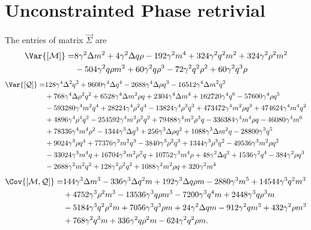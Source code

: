\section{Unconstrainted Phase retrivial}
The entries of matrix \(\vec{\Sigma}\) are 
\[\begin{split}
  \Var{[\mathcal{M}]} =& 8 \gamma ^2 \Delta  m^2+4 \gamma ^2 \Delta  q \rho-192 \gamma ^2 m^4+324 \gamma ^2 q^2 m^2+324 \gamma ^2 \rho^2 m^2 \\
                       & -504 \gamma ^2 q \rho m^2+60 \gamma ^2 q \rho^3-72 \gamma ^2 q^2 \rho^2+60 \gamma ^2 q^3 \rho 
\end{split}\]\[\begin{split}
  \Var{[\mathcal{Q}]} =& 128 \gamma ^4 \Delta ^2 q^2+9600 \gamma ^4 \Delta  q^4-2688 \gamma ^4 \Delta  \rho q^3-16512 \gamma ^4 \Delta  m^2 q^2 \\
                       &+768 \gamma ^4 \Delta  \rho^2 q^2+6528 \gamma ^4 \Delta  m^2 \rho q+2304 \gamma ^4 \Delta  m^4+162720 \gamma ^4 q^6-57600 \gamma ^4 \rho q^5 \\
                       &-593280 \gamma ^4 m^2 q^4+28224 \gamma ^4 \rho^2 q^4-13824 \gamma ^4 \rho^3 q^3+473472 \gamma ^4 m^2 \rho q^3+474624 \gamma ^4 m^4 q^2 \\
                       &+4896 \gamma ^4 \rho^4 q^2-254592 \gamma ^4 m^2 \rho^2 q^2+79488 \gamma ^4 m^2 \rho^3 q-336384 \gamma ^4 m^4 \rho q-46080 \gamma ^4 m^6 \\
                       &+78336 \gamma ^4 m^4 \rho^2-1344 \gamma ^3 \Delta  q^3+256 \gamma ^3 \Delta  \rho q^2+1088 \gamma ^3 \Delta  m^2 q-28800 \gamma ^3 q^5 \\
                       &+9024 \gamma ^3 \rho q^4+77376 \gamma ^3 m^2 q^3-3840 \gamma ^3 \rho^2 q^3+1344 \gamma ^3 \rho^3 q^2-49536 \gamma ^3 m^2 \rho q^2 \\
                       &-33024 \gamma ^3 m^4 q+16704 \gamma ^3 m^2 \rho^2 q+10752 \gamma ^3 m^4 \rho+48 \gamma ^2 \Delta  q^2+1536 \gamma ^2 q^4-384 \gamma ^2 \rho q^3 \\
                       &-2688 \gamma ^2 m^2 q^2+128 \gamma ^2 \rho^2 q^2+1088 \gamma ^2 m^2 \rho q+320 \gamma ^2 m^4 
\end{split}\]\[\begin{split}
  \Cov{[\mathcal{M},\mathcal{Q}]} =& 144 \gamma ^3 \Delta  m^3-336 \gamma ^3 \Delta  q^2 m+192 \gamma ^3 \Delta  q \rho m-2880 \gamma ^3 m^5+14544 \gamma ^3 q^2 m^3  \\
                                   &+4752 \gamma ^3 \rho^2 m^3-13536 \gamma ^3 q \rho m^3-7200 \gamma ^3 q^4 m+2448 \gamma ^3 q \rho^3 m \\
                                   &-5184 \gamma ^3 q^2 \rho^2 m+7056 \gamma ^3 q^3 \rho m +24 \gamma ^2 \Delta  q m-912 \gamma ^2 q m^3+432 \gamma ^2 \rho m^3 \\
                                   &+768 \gamma ^2 q^3 m+336 \gamma ^2 q \rho^2 m-624 \gamma ^2 q^2 \rho m.
\end{split}\]

